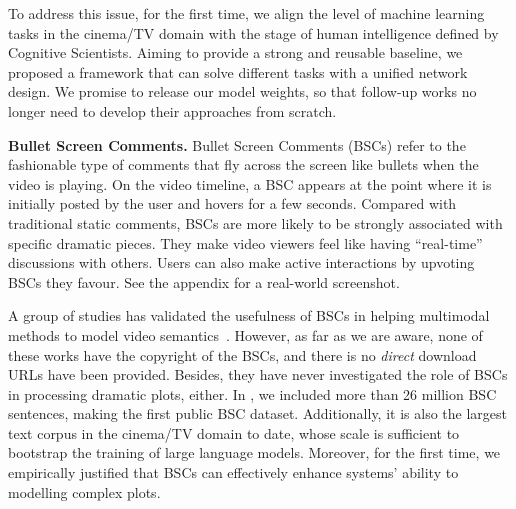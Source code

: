 To address this issue, for the first time, we align the level of machine learning tasks in the cinema/TV domain with the stage of human intelligence defined by Cognitive Scientists. Aiming to provide a strong and reusable baseline, we proposed a framework that can solve different tasks with a unified network design. We promise to release our model weights, so that follow-up works no longer need to develop their approaches from scratch.

\noindent\textbf{Bullet Screen Comments.} Bullet Screen Comments (BSCs) refer to the fashionable type of comments that fly across the screen like bullets when the video is playing. On the video timeline, a BSC appears at the point where it is initially posted by the user and hovers for a few seconds.
Compared with traditional static comments, BSCs are more likely to be strongly associated with specific dramatic pieces.
They make video viewers feel like having ``real-time'' discussions with others. Users can also make active interactions by upvoting BSCs they favour. 
See the appendix for a real-world screenshot.

A group of studies has validated the usefulness of BSCs in helping multimodal methods to model video semantics~\citep{bs32018movie,bs2www2020,bs12022aaai,yang2019time,wang2020videoic}. However, as far as we are aware, none of these works have the copyright of the BSCs, and there is no \textit{direct} download URLs have been provided. Besides, they have never investigated the role of BSCs in processing dramatic plots, either. In \TVD, we included more than 26 million BSC sentences, making the first public BSC dataset. Additionally, it is also the largest text corpus in the cinema/TV domain to date, whose scale is sufficient to bootstrap the training of large language models. Moreover, for the first time, we empirically justified that BSCs can effectively enhance systems' ability to modelling complex plots. 